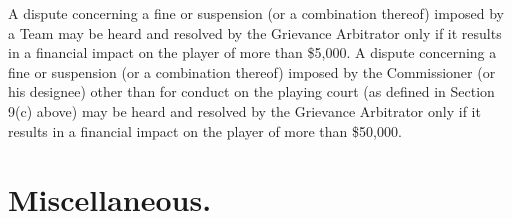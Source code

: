 \documentclass[
]{book}
\begin{document}
A dispute concerning a fine or suspension (or a combination thereof) imposed by a Team may be heard and resolved by the Grievance Arbitrator only if it results in a financial impact on the player of more than \$5,000. A dispute concerning a fine or suspension (or a combination thereof) imposed by the Commissioner (or his designee) other than for conduct on the playing court (as defined in Section 9(c) above) may be heard and resolved by the Grievance Arbitrator only if it results in a financial impact on the player of more than \$50,000.

\hypertarget{miscellaneous.-1}{%
\section{Miscellaneous.}\label{miscellaneous.-1}}
\end{document}
